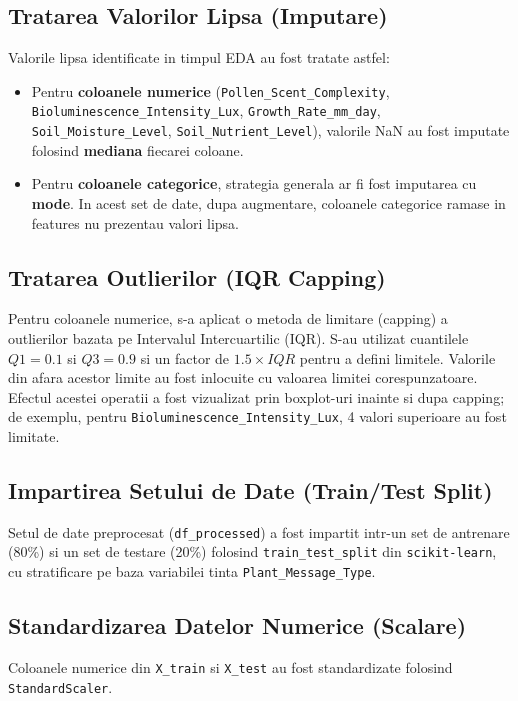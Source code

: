 \documentclass[11pt, a4paper]{article}
\begin{document}
\subsection{Tratarea Valorilor Lipsa (Imputare)}
Valorile lipsa identificate in timpul EDA au fost tratate astfel:
\sloppy
\begin{itemize}[noitemsep, topsep=1pt]
    \item Pentru \textbf{coloanele numerice} (\texttt{Pollen\_Scent\_Complexity}, \texttt{Bioluminescence\_Intensity\_Lux}, \texttt{Growth\_Rate\_mm\_day}, \texttt{Soil\_Moisture\_Level}, \texttt{Soil\_Nutrient\_Level}), valorile NaN au fost imputate folosind \textbf{mediana} fiecarei coloane.
    \item Pentru \textbf{coloanele categorice}, strategia generala ar fi fost imputarea cu \textbf{mode}. In acest set de date, dupa augmentare, coloanele categorice ramase in features nu prezentau valori lipsa.
\end{itemize}


\subsection{Tratarea Outlierilor (IQR Capping)}
Pentru coloanele numerice, s-a aplicat o metoda de limitare (capping) a outlierilor bazata pe Intervalul Intercuartilic (IQR). S-au utilizat cuantilele $Q1=0.1$ si $Q3=0.9$ si un factor de $1.5 \times IQR$ pentru a defini limitele. Valorile din afara acestor limite au fost inlocuite cu valoarea limitei corespunzatoare. Efectul acestei operatii a fost vizualizat prin boxplot-uri inainte si dupa capping; de exemplu, pentru \texttt{Bioluminescence\_Intensity\_Lux}, 4 valori superioare au fost limitate.

\subsection{Impartirea Setului de Date (Train/Test Split)}
Setul de date preprocesat (\texttt{df\_processed}) a fost impartit intr-un set de antrenare (80\%) si un set de testare (20\%) folosind \texttt{train\_test\_split} din \texttt{scikit-learn}, cu stratificare pe baza variabilei tinta \texttt{Plant\_Message\_Type}.

\subsection{Standardizarea Datelor Numerice (Scalare)}
Coloanele numerice din \texttt{X\_train} si \texttt{X\_test} au fost standardizate folosind \texttt{StandardScaler}.
\end{document}
